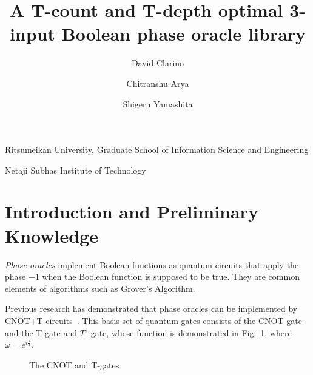 \documentclass[a4paper]{article}
\makeatletter
\newcommand{\sublabel}[1]{\protected@edef\@currentlabel{\thefigure(\thesubfigure)}\label{#1}}
\makeatother
\begin{document}
\title{
   A T-count and T-depth optimal 3-input Boolean phase oracle library
}

\author{
  David Clarino
  \and
  Chitranshu Arya
  \and
 Shigeru Yamashita
  }
  
\address{1}{
  Ritsumeikan University, Graduate School of Information Science and Engineering
}
\address{2}{
  Netaji Subhas Institute of Technology
}





\maketitle


\section{Introduction and Preliminary Knowledge}
{\it Phase oracles} implement Boolean functions as quantum circuits that apply the phase $-1$
when the Boolean function is supposed to be true. They are common elements of algorithms such
as Grover's Algorithm.

Previous research has demonstrated that phase oracles can be implemented by CNOT+T circuits~\cite{bib-amy-cnot}.
This basis set of quantum gates consists of the CNOT gate and the T-gate and $T^{\dagger}$-gate,
whose function is demonstrated in Fig.~\ref{fig-gates}, where $\omega = e^{i\frac{\pi}{4}}$.

\begin{figure}[t]
  \begin{minipage}{0.45\textwidth}
    \centering
    \scalebox{1.0}{
      
    }
    \sublabel{fig-cnot}
  \end{minipage}
  \begin{minipage}{0.45\textwidth}
  \centering
    \scalebox{1.0} {
      
    }
    \sublabel{fig-tgate}
    \scalebox{1.0} {
      
    }
    \sublabel{fig-tdgate}
  \end{minipage}
  \caption{The CNOT and T-gates}
  \label{fig-gates}
\end{figure}
\end{document}
